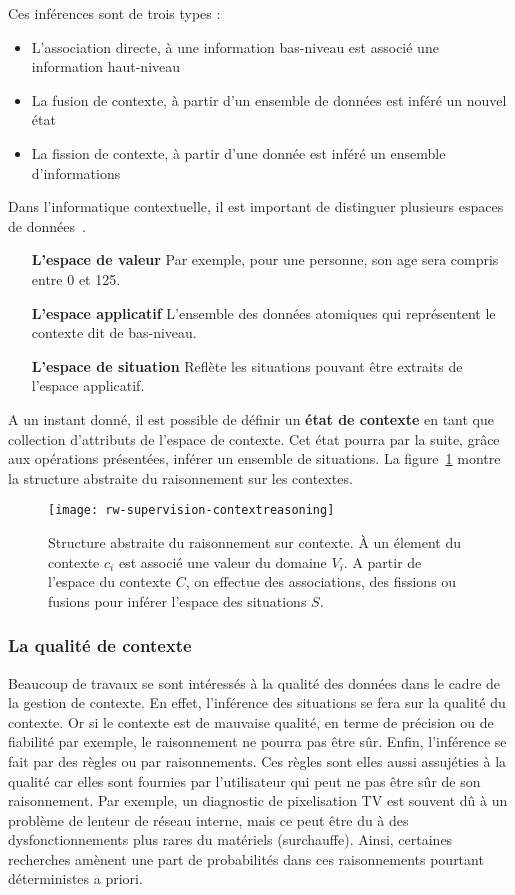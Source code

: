 Ces inférences sont de trois types :
\begin{itemize}
 \item L'association directe, à une information bas-niveau est associé une information haut-niveau 
 \item La fusion de contexte, à partir d'un ensemble de données est inféré un nouvel état 
 \item La fission de contexte, à partir d'une donnée est inféré un ensemble d'informations
\end{itemize}

Dans l'informatique contextuelle, il est important de distinguer plusieurs espaces de données~\cite{Padovitz:agent}. 
\begin{itemize}
 \item[\textbf{L'espace de valeur}] Par exemple, pour une personne, son age sera compris entre 0 et 125.
 \item[\textbf{L'espace applicatif}] L'ensemble des données atomiques qui représentent le contexte dit de bas-niveau.
 \item[\textbf{L'espace de situation}] Reflète les situations pouvant être extraits de l'espace applicatif.
\end{itemize}

A un instant donné, il est possible de définir un \textbf{état de contexte} en tant que collection d'attributs de l'espace de contexte. Cet état pourra par la suite, grâce aux opérations présentées, inférer un ensemble de situations. La figure~\ref{rw-supervision-contextreasoning} montre la structure abstraite du raisonnement sur les contextes.
\begin{figure}[ht]
    \centering
    \texttt{[image: rw-supervision-contextreasoning]}
    \caption{Structure abstraite du raisonnement sur contexte. À un élement du contexte $c_i$ est associé une valeur du domaine $V_i$. A partir de l'espace du contexte $C$, on effectue des associations, des fissions ou fusions pour inférer l'espace des situations $S$.}\label{rw-supervision-contextreasoning}
\end{figure}

\subsubsection{La qualité de contexte}
Beaucoup de travaux se sont intéressés à la qualité des données dans le cadre de la gestion de contexte. En effet, l'inférence des situations se fera sur la qualité du contexte. Or si le contexte est de mauvaise qualité, en terme de précision ou de fiabilité par exemple, le raisonnement ne pourra pas être sûr. Enfin, l'inférence se fait par des règles ou par raisonnements. Ces règles sont elles aussi assujéties à la qualité car elles sont fournies par l'utilisateur qui peut ne pas être sûr de son raisonnement. Par exemple, un diagnostic de pixelisation TV est souvent dû à un problème de lenteur de réseau interne, mais ce peut être du à des dysfonctionnements plus rares du matériels (surchauffe). Ainsi, certaines recherches amènent une part de probabilités dans ces raisonnements pourtant déterministes a priori.

